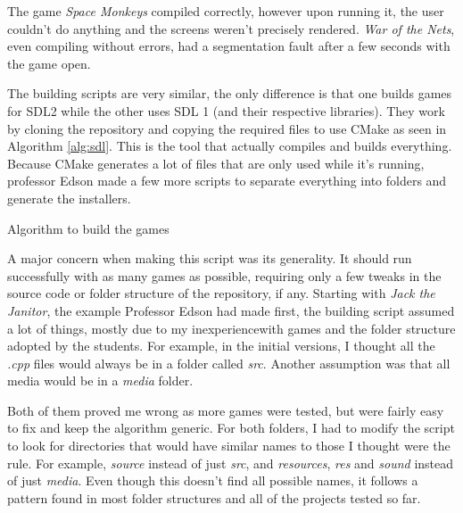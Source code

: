The game \textit{Space Monkeys} compiled correctly, however upon running it, the user couldn't do anything and the screens weren't precisely rendered. \textit{War of the Nets}, even compiling without errors, had a segmentation fault after a few seconds with the game open.

The building scripts are very similar, the only difference is that one builds games for SDL2 while the other uses SDL 1 (and their respective libraries). They work by cloning the repository and copying the required files to use CMake as seen in Algorithm \ref{alg:sdl}. This is the tool that actually compiles and builds everything. Because CMake generates a lot of files that are only used while it's running, professor Edson made a few more scripts to separate everything into folders and generate the installers.

\begin{algorithm}[h!]
\caption{Algorithm to build the games}
\label{alg:sdl}
\begin{algorithmic}
\Start
{}  
\State {} 
 
 
\State {} 
\State {} 
\State {} 
\State {} 
\End
\end{algorithmic}
\end{algorithm}

A major concern when making this script was its generality. It should run successfully with as many games as possible, requiring only a few tweaks in the source code or folder structure of the repository, if any. Starting with \textit{Jack the Janitor}, the example Professor Edson had made first, the  building script assumed a lot of things, mostly due to my inexperiencewith games and the folder structure adopted by the students. For example, in the initial versions, I thought all the \textit{.cpp} files would always be in a folder called \textit{src}. Another assumption was that all media would be in a \textit{media} folder.

Both of them proved me wrong as more games were tested, but were fairly easy to fix and keep the algorithm generic. For both folders, I had to modify the script to look for directories that would have similar names to those I thought were the rule. For example, \textit{source} instead of just \textit{src}, and \textit{resources}, \textit{res} and \textit{sound} instead of just \textit{media}. Even though this doesn't find all possible names, it follows a pattern found in most folder structures and all of the projects tested so far.

